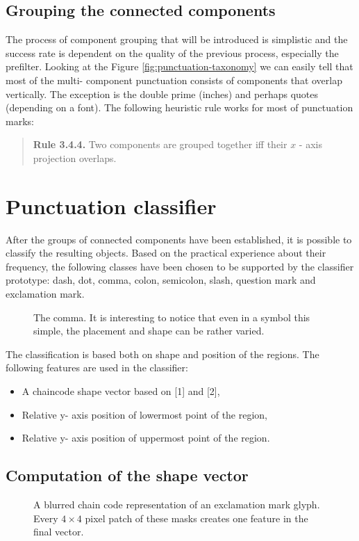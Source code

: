 \documentclass[12pt,a4paper]{report}
\begin{document}
\subsection{Grouping the connected components}
The process of component grouping that will be introduced is simplistic and the success rate is dependent on the quality of the previous process, especially the prefilter. Looking at the Figure \ref{fig:punctuation-taxonomy} we can easily tell that most of the multi- component punctuation consists of components that overlap vertically. The exception is the double prime (inches) and perhaps quotes (depending on a font). The following heuristic rule works for most of punctuation marks:
\begin{quote}
\textbf{Rule 3.4.4.} Two components are grouped together iff their $x$ - axis projection overlaps.
\end{quote}

\section{Punctuation classifier}
After the groups of connected components have been established, it is possible to classify the resulting objects. Based on the practical experience about their frequency, the following classes have been chosen to be supported by the classifier prototype: dash, dot, comma, colon, semicolon, slash, question mark and exclamation mark.

\begin{figure}[htbp]
    \centering
    \caption{The comma. It is interesting to notice that even in a symbol this simple, the placement and shape can be rather varied.}
    \label{fig:comma}
\end{figure}

The classification is based both on shape and position of the regions. The following features are used in the classifier:
\begin{itemize}
    \item A chaincode shape vector based on [1] and [2],
    \item Relative y- axis position of lowermost point of the region,
    \item Relative y- axis position of uppermost point of the region.
\end{itemize}

\subsection{Computation of the shape vector}
\begin{figure}[htbp]
    \centering
    \caption{A blurred chain code representation of an exclamation mark glyph. Every $4 \times 4$ pixel patch of these masks creates one feature in the final vector.}
    \label{fig:chaincode}
\end{figure}
\end{document}
